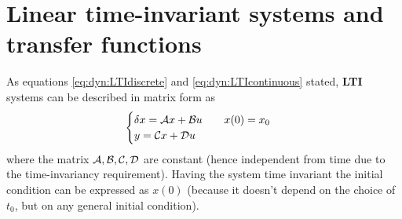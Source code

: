 \section{Linear time-invariant systems and transfer functions}
	As equations \ref{eq:dyn:LTIdiscrete} and \ref{eq:dyn:LTIcontinuous} stated,  \textbf{LTI} systems can be described in matrix form as
	\[ \begin{cases}
		\delta x = \mathcal{A} x + \mathcal{B} u \qquad x(0) = x_0\\ y = \mathcal{C} x + \mathcal{D} u 
	\end{cases} \]
	where the matrix $\mathcal{A},\mathcal{B},\mathcal{C},\mathcal{D}$ are constant (hence independent from time due to the time-invariancy requirement). Having the system time invariant the initial condition can be expressed as $x(0)$ (because it doesn't depend on the choice of $t_0$, but on any general initial condition).
	
